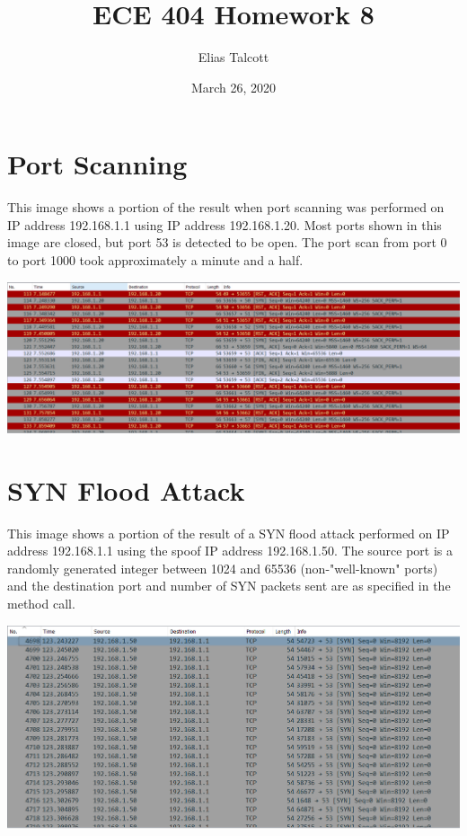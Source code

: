 \documentclass[11pt]{article}
\def \myTitle {ECE 404 Homework 8}
\def \myName {Elias Talcott}
\def \myDate {March 26, 2020}
\begin{document}
\begin{titlepage}
\title{\myTitle}
\author{\myName}
\date{\myDate}
\maketitle
\vspace{1in}
\tableofcontents
\thispagestyle{empty}
\end{titlepage}


\section{Port Scanning}

This image shows a portion of the result when port scanning was performed on IP address 192.168.1.1 using IP address 192.168.1.20. Most ports shown in this image are closed, but port 53 is detected to be open. The port scan from port 0 to port 1000 took approximately a minute and a half.

\includegraphics[width=\linewidth]{PortScanning.png}

\section{SYN Flood Attack}

This image shows a portion of the result of a SYN flood attack performed on IP address 192.168.1.1 using the spoof IP address 192.168.1.50. The source port is a randomly generated integer between 1024 and 65536 (non-"well-known" ports) and the destination port and number of SYN packets sent are as specified in the method call. 

\includegraphics[width=\linewidth]{SYNFlood.png}
\end{document}
